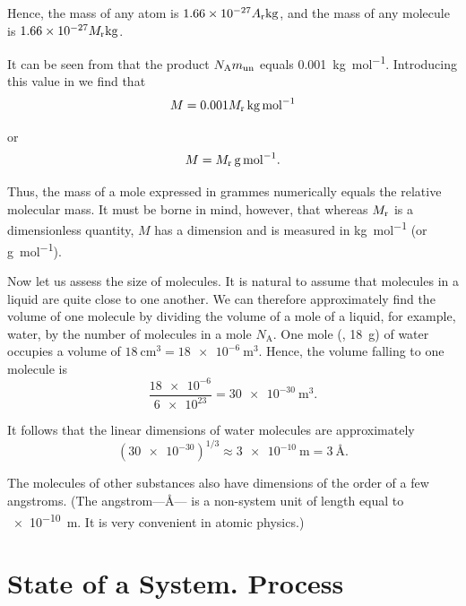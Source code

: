 \noindent
Hence, the mass of any atom is $\num{1.66e-27}A_{\text{r}}\si{\kilo\gram}$, and the mass of any molecule is $\num{1.66e-27}M_{\text{r}}\si{\kilo\gram}$.

It can be seen from  that the product $N_{\text{A}}m_{\text{un}}$ equals \SI{0.001}{\kilo\gram\per\mole}. Introducing this value in  we find that
\begin{equation}\label{eq:10_4}
	M = 0.001 M_{\text{r}}\, \si{\kilo\gram\per\mole}
\end{equation}

\noindent
or
\begin{equation}\label{eq:10_5}
	M = M_{\text{r}}\, \si{\gram\per\mole}.
\end{equation}

\noindent
Thus, the mass of a mole expressed in grammes numerically equals the relative molecular mass. It must be borne in mind, however, that whereas $M_{\text{r}}$ is a dimensionless quantity, $M$ has a dimension and is measured in \si{\kilo\gram\per\mole} (or \si{\gram\per\mole}).

Now let us assess the size of molecules. It is natural to assume that molecules in a liquid are quite close to one another. We can therefore approximately find the volume of one molecule by dividing the volume of a mole of a liquid, for example, water, by the number of molecules in a mole $N_{\text{A}}$. One mole (\ie, \SI{18}{\gram}) of water occupies a volume of $\SI{18}{\centi\metre\cubed}=\SI{18e-6}{\metre\cubed}$. Hence, the volume falling to one molecule is
\begin{equation*}
	\frac{\num{18e-6}}{\num{6e23}} = \SI{30e-30}{\metre\cubed}.
\end{equation*}

\noindent
It follows that the linear dimensions of water molecules are approximately
\begin{equation*}
	\left(\num{30e-30}\right)^{1/3} \approx \SI{3e-10}{\metre} = \SI{3}{\angstrom}.
\end{equation*}

The molecules of other substances also have dimensions of the order of a few angstroms. (The angstrom---\si{\angstrom}--- is a non-system unit of length equal to \SI{e-10}{\metre}. It is very convenient in atomic physics.)

\section{State of a System. Process}\label{sec:10_3}

